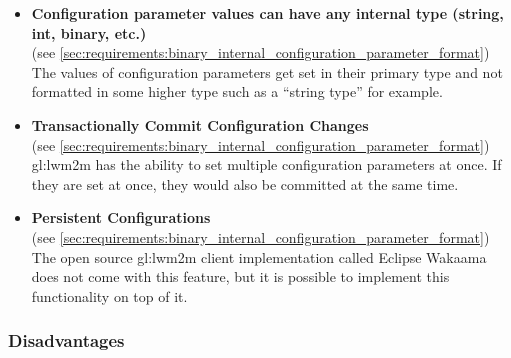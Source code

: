 \begin{itemize}
      \item \textbf{Configuration parameter values can have any internal type (string, int, binary, etc.)}\\
            (see \autoref{sec:requirements:binary_internal_configuration_parameter_format})\\
            The values of configuration parameters get set in their primary type and not formatted in some higher type such as a ``string type'' for example.

      \item \textbf{Transactionally Commit Configuration Changes}\\
            (see \autoref{sec:requirements:binary_internal_configuration_parameter_format})\\
            \gls{gl:lwm2m} has the ability to set multiple configuration parameters at once.
            If they are set at once, they would also be committed at the same time.

      \item \textbf{Persistent Configurations}\\
            (see \autoref{sec:requirements:binary_internal_configuration_parameter_format})\\
            The open source \gls{gl:lwm2m} client implementation called Eclipse Wakaama \cite{eclipse_wakaama} does not come with this feature, but it is possible to implement this functionality on top of it.
\end{itemize}

\subsubsection{Disadvantages}

